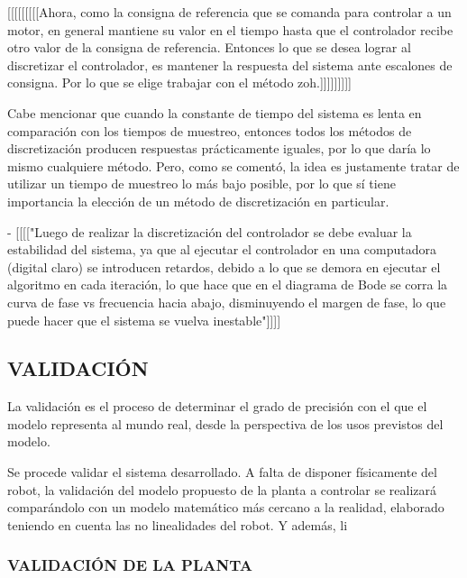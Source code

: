 \documentclass{article}
\begin{document}
\begin{sloppypar}
[[[[[[[[[Ahora, como la consigna de referencia que se comanda para controlar a un motor, en general mantiene su valor en el tiempo hasta que el controlador recibe otro valor de la consigna de referencia. Entonces lo que se desea lograr al discretizar el controlador, es mantener la respuesta del sistema ante escalones de consigna. Por lo que se elige trabajar con el método zoh.]]]]]]]]]%

Cabe mencionar que cuando la constante de tiempo del sistema es lenta en comparación con los tiempos de muestreo, entonces todos los métodos de discretización producen respuestas prácticamente iguales, por lo que daría lo mismo cualquiere método. Pero, como se comentó, la idea es justamente tratar de utilizar un tiempo de muestreo lo más bajo posible, por lo que sí tiene importancia la elección de un método de discretización en particular.

- [[[["Luego de realizar la discretización del controlador se debe evaluar la estabilidad del sistema, ya que al ejecutar el controlador en una computadora (digital claro) se introducen retardos, debido a lo que se demora en ejecutar el algoritmo en cada iteración, lo que hace que en el diagrama de Bode se corra la curva de fase vs frecuencia hacia abajo, disminuyendo el margen de fase, lo que puede hacer que el sistema se vuelva inestable"]]]]



\subsection{VALIDACIÓN}
\label{sec:VALIDACIÓN}

La validación es el proceso de determinar el grado de precisión con el que el modelo representa al mundo real, desde la perspectiva de los usos previstos del modelo.

Se procede validar el sistema desarrollado. A falta de disponer físicamente del robot, la validación del modelo propuesto de la planta a controlar se realizará comparándolo con un modelo matemático más cercano a la realidad, elaborado teniendo en cuenta las no linealidades del robot. Y además, li

\subsubsection{VALIDACIÓN DE LA PLANTA}
\label{sec:VALIDACIÓN DE LA PLANTA}


\end{sloppypar}
\end{document}
